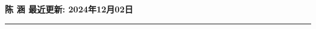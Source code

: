\documentclass[10pt]{article}
\newcommand{\makeheading}[1]%
        {\hspace*{-\marginparsep minus \marginparwidth}%
         \begin{minipage}[t]{\textwidth+\marginparwidth+\marginparsep}%
                {\large \bfseries #1}\\[-0.15\baselineskip]%
                 \rule{\columnwidth}{1pt}%
         \end{minipage}}
\renewcommand{\section}[2]%
        {\pagebreak[2]\vspace{1\baselineskip}%
         \phantomsection\addcontentsline{toc}{section}{#1}%
         \hspace{0in}%
         \marginpar{
         \raggedright \scshape #1}#2}
\newenvironment{outerlist}[1][\enskip\textbullet]%
        {%
        \begin{itemize}[label=#1, itemsep=1pt]}{\end{itemize}%
         \vspace{-0.6\baselineskip}}
\begin{document}



\pagebreak
	
\makeheading{陈 涵 \hfill {\small 最近更新: 2024年12月02日}}


\vspace{-0.2in}
\end{document}
